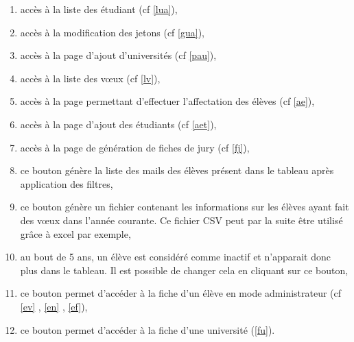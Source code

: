\begin{enumerate}
\item accès à la liste des étudiant (cf \ref{lua}),
\item accès à la modification des jetons (cf \ref{gua}),
\item accès à la page d'ajout d'universités (cf \ref{pau}),
\item accès à la liste des vœux (cf \ref{lv}),
\item accès à la page permettant d'effectuer l'affectation des élèves (cf \ref{ae}),
\item accès à la page d'ajout des étudiants (cf \ref{aet}),
\item accès à la page de génération de fiches de jury (cf \ref{fj}),
\item ce bouton génère la liste des mails des élèves présent dans le tableau après application des filtres,
\item ce bouton génère un fichier contenant les informations sur les élèves ayant fait des vœux dans l'année courante. Ce fichier CSV peut par la suite être utilisé grâce à excel par exemple,
\item au bout de 5 ans, un élève est considéré comme inactif et n'apparait donc plus dans le tableau. Il est possible de changer cela en cliquant sur ce bouton,
\item ce bouton permet d'accéder à la fiche d'un élève en mode administrateur (cf \ref{ev} , \ref{en} , \ref{ef}),
\item ce bouton permet d'accéder à la fiche d'une université (\ref{fu}).
\end{enumerate}

 
